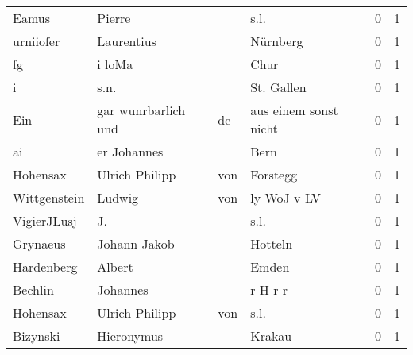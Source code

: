 \begin{tabular}{llllrr}
                    Eamus &                             Pierre &             &                                        s.l. &          0 &         1 \\
                urniiofer &                         Laurentius &             &                                    Nürnberg &          0 &         1 \\
                       fg &                             i loMa &             &                                        Chur &          0 &         1 \\
                        i &                               s.n. &             &                                  St. Gallen &          0 &         1 \\
                      Ein &                gar wunrbarlich und &          de &                       aus einem sonst nicht &          0 &         1 \\
                       ai &                        er Johannes &             &                                        Bern &          0 &         1 \\
                 Hohensax &                     Ulrich Philipp &         von &                                    Forstegg &          0 &         1 \\
             Wittgenstein &                             Ludwig &         von &                                 ly WoJ v LV &          0 &         1 \\
              VigierJLusj &                                 J. &             &                                        s.l. &          0 &         1 \\
                 Grynaeus &                       Johann Jakob &             &                                     Hotteln &          0 &         1 \\
               Hardenberg &                             Albert &             &                                       Emden &          0 &         1 \\
                  Bechlin &                           Johannes &             &                                     r H r r &          0 &         1 \\
                 Hohensax &                     Ulrich Philipp &         von &                                        s.l. &          0 &         1 \\
                 Bizynski &                         Hieronymus &             &                                      Krakau &          0 &         1 \\

\end{tabular}
